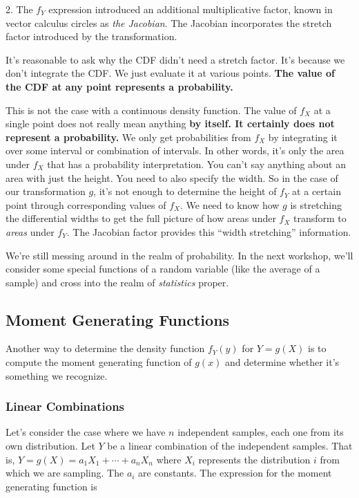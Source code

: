\documentclass[]{article}
\begin{document}
2. The $f_Y$ expression introduced an additional multiplicative
   factor, known in vector calculus circles as \emph{the Jacobian}.
   The Jacobian incorporates the stretch factor introduced by the
   transformation.

It's reasonable to ask why the CDF didn't need a stretch factor.
It's because we don't integrate the CDF.  We just evaluate it at
various points.
\textbf{The value of the CDF at any point represents a probability.}

This is not the case with a continuous density function.  The
value of $f_X$ at a single point does not really mean anything
\textbf{by itself.
It certainly does not represent a probability.}  We only get
probabilities from $f_X$ by integrating it over some interval
or combination of intervals.  In other words, it's only the
area under $f_X$ that has a probability interpretation.  You
can't say anything about an area with just the height.  You
need to also specify the width.  So in the case of our transformation
$g$, it's not enough to determine the height of $f_Y$ at a certain
point through corresponding values of $f_X$.  We need to know how
$g$ is stretching the differential widths to get the full picture
of how areas under $f_X$ transform to \emph{areas} under $f_Y$.  The
Jacobian factor provides this ``width stretching'' information.

We're still messing around in the realm of probability.  In the next
workshop, we'll consider some special functions of a random
variable (like the average of a sample) and cross into the
realm of \emph{statistics} proper.

\subsection{Moment Generating Functions}

Another way to determine the density function $f_Y(y)$ for
$Y = g(X)$ is to compute the moment generating function of
$g(x)$ and determine whether it's something we recognize.

\subsubsection{Linear Combinations}

Let's consider the case where we have $n$ independent samples,
each one from its own distribution.  Let $Y$ be a linear
combination of the independent samples.  That is,
$Y = g(X) = a_1 X_1 + \cdots + a_n X_n$ where $X_i$
represents the distribution $i$ from which we are sampling.
The $a_i$ are constants.
The expression for the moment generating function is
\end{document}
